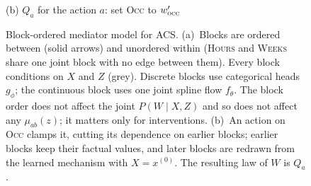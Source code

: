 \begin{figure}[t]
\vspace{1mm}
{\scriptsize (b) $Q_a$ for the action $a$: set \textsc{Occ} to $w'_{\textsc{occ}}$}
\caption{Block-ordered mediator model for ACS.
(a)~Blocks are ordered between (solid arrows) and unordered within
(\textsc{Hours} and \textsc{Weeks} share one joint block with no edge between
them). Every block conditions on $X$ and $Z$ (grey). Discrete blocks use
categorical heads $g_\phi$; the continuous block uses one joint spline flow
$f_\theta$. The block order does not
affect the joint $P(W\mid X,Z)$ and so does not affect any $\mu_{ab}(z)$; it
matters only for interventions.
(b)~An action on \textsc{Occ} clamps it, cutting its dependence on earlier
blocks; earlier blocks keep their factual values, and later blocks are
redrawn from the learned mechanism with $X=x^{(0)}$. The resulting law of $W$
is $Q_a$.}
\label{fig:block_model}
\end{figure}
